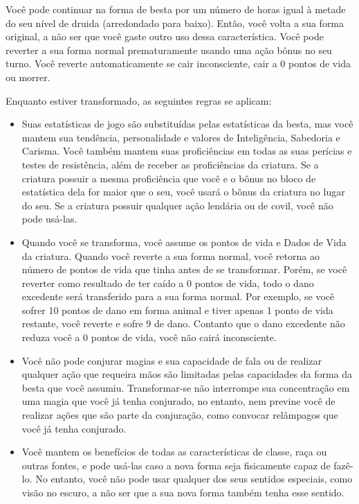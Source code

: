 \documentclass[a4paper,12p]{book}
\begin{document}
\begin{multicols}{2}
	Você pode continuar na forma de besta por um número de horas igual à metade do seu nível de druida (arredondado para baixo). Então, você volta a sua forma original, a não ser que você gaste outro uso dessa característica. Você pode reverter a sua forma normal prematuramente usando uma ação bônus no seu turno. Você reverte automaticamente se cair inconsciente, cair a 0 pontos de vida ou morrer.
	
	Enquanto estiver transformado, as seguintes regras se aplicam:
	
	\begin{itemize}
		\item Suas estatísticas de jogo são substituídas pelas estatísticas da besta, mas você mantem sua tendência, personalidade e valores de Inteligência, Sabedoria e Carisma. Você também mantem suas proficiências em todas as suas perícias e testes de resistência, além de receber as proficiências da criatura. Se a criatura possuir a mesma proficiência que você e o bônus no bloco de estatística dela for maior que o seu, você usará o bônus da criatura no lugar do seu. Se a criatura possuir qualquer ação lendária ou de covil, você não pode usá-las.
		
		\item Quando você se transforma, você assume os pontos de vida e Dados de Vida da criatura. Quando você reverte a sua forma normal, você retorna ao número de pontos de vida que tinha antes de se transformar. Porém, se você reverter como resultado de ter caído a 0 pontos de vida, todo o dano excedente será transferido para a sua forma normal. Por exemplo, se você sofrer 10 pontos de dano em forma animal e tiver apenas 1 ponto de vida restante, você reverte e sofre 9 de dano. Contanto que o dano excedente não reduza você a 0 pontos de vida, você não cairá inconsciente.
		
		\item Você não pode conjurar magias e sua capacidade de fala ou de realizar qualquer ação que requeira mãos são limitadas pelas capacidades da forma da besta que você assumiu. Transformar-se não interrompe sua concentração em uma magia que você já tenha conjurado, no entanto, nem previne você de realizar ações que são parte da conjuração, como convocar relâmpagos que você já tenha conjurado.
		
		
		\columnbreak
		
		\item Você mantem os benefícios de todas as características de classe, raça ou outras fontes, e pode usá-las caso a nova forma seja fisicamente capaz de fazê-lo. No entanto, você não pode usar qualquer dos seus sentidos especiais, como visão no escuro, a não ser que a sua nova forma também tenha esse sentido.
		

\end{itemize}
\end{multicols}
\end{document}
